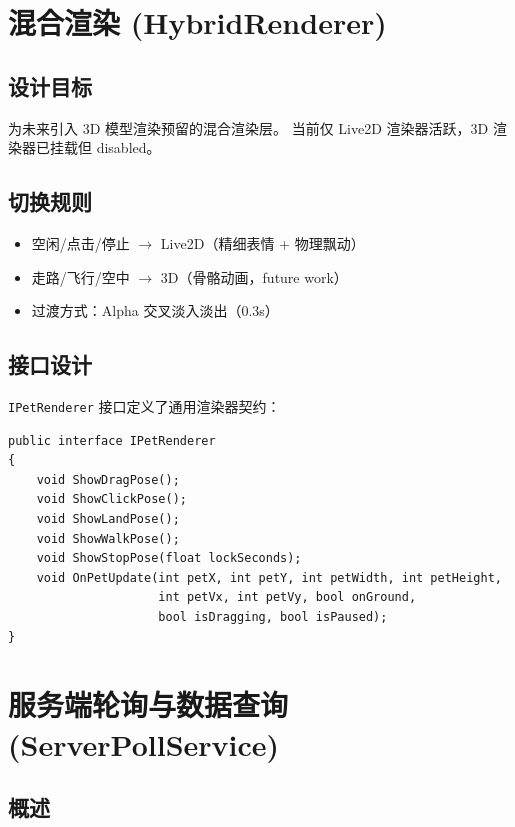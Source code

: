 \documentclass[12pt,a4paper]{ctexart}
\begin{document}
\section{混合渲染 (HybridRenderer)}

\subsection{设计目标}

为未来引入 3D 模型渲染预留的混合渲染层。
当前仅 Live2D 渲染器活跃，3D 渲染器已挂载但 disabled。

\subsection{切换规则}

\begin{itemize}
    \item 空闲/点击/停止 $\to$ Live2D（精细表情 + 物理飘动）
    \item 走路/飞行/空中 $\to$ 3D（骨骼动画，future work）
    \item 过渡方式：Alpha 交叉淡入淡出（0.3s）
\end{itemize}

\subsection{接口设计}

\texttt{IPetRenderer} 接口定义了通用渲染器契约：

\begin{lstlisting}[style=csharp,caption={IPetRenderer 接口},label={lst:ipet}]
public interface IPetRenderer
{
    void ShowDragPose();
    void ShowClickPose();
    void ShowLandPose();
    void ShowWalkPose();
    void ShowStopPose(float lockSeconds);
    void OnPetUpdate(int petX, int petY, int petWidth, int petHeight,
                     int petVx, int petVy, bool onGround,
                     bool isDragging, bool isPaused);
}
\end{lstlisting}

\section{服务端轮询与数据查询 (ServerPollService)}

\subsection{概述}
\end{document}
